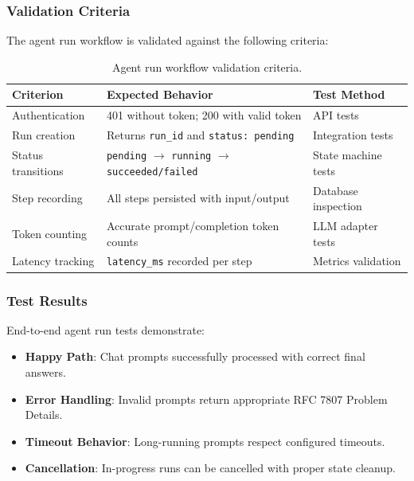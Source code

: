 \subsubsection{Validation Criteria}

The agent run workflow is validated against the following criteria:

\begin{table}[ht]
\centering
\caption{Agent run workflow validation criteria.}
\label{tab:agent-run-criteria}
\small
\begin{tabular}{lll}
\hline
\textbf{Criterion} & \textbf{Expected Behavior} & \textbf{Test Method} \\
\hline
Authentication & 401 without token; 200 with valid token & API tests \\
Run creation & Returns \texttt{run\_id} and \texttt{status: pending} & Integration tests \\
Status transitions & \texttt{pending} $\rightarrow$ \texttt{running} $\rightarrow$ \texttt{succeeded/failed} & State machine tests \\
Step recording & All steps persisted with input/output & Database inspection \\
Token counting & Accurate prompt/completion token counts & LLM adapter tests \\
Latency tracking & \texttt{latency\_ms} recorded per step & Metrics validation \\
\hline
\end{tabular}
\end{table}

\subsubsection{Test Results}

End-to-end agent run tests demonstrate:

\begin{itemize}
    \item \textbf{Happy Path}: Chat prompts successfully processed with correct final answers.
    \item \textbf{Error Handling}: Invalid prompts return appropriate RFC 7807 Problem Details.
    \item \textbf{Timeout Behavior}: Long-running prompts respect configured timeouts.
    \item \textbf{Cancellation}: In-progress runs can be cancelled with proper state cleanup.
\end{itemize}

